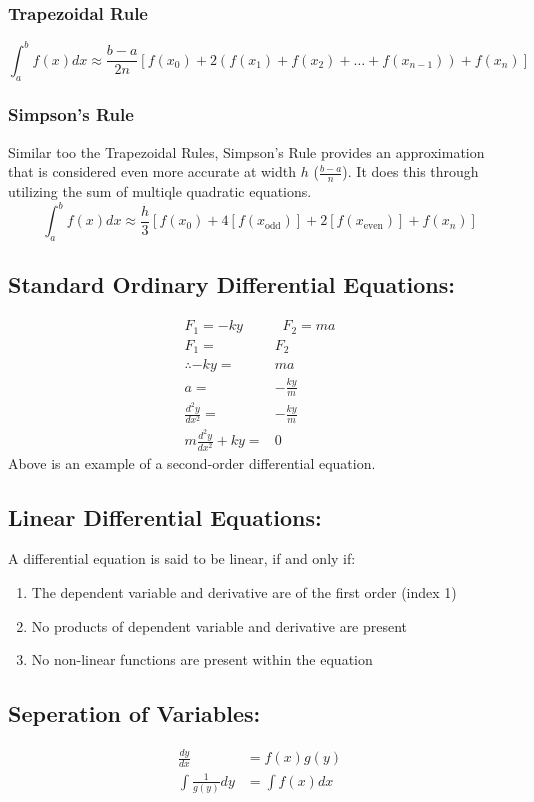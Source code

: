 \documentclass[a5paper]{article}
\begin{document}
	\subsubsection{Trapezoidal Rule}
	$$\int^{b}_{a}f(x)dx\approx\frac{b-a}{2n}[f(x_{0})+2(f(x_{1})+f(x_{2})+\ldots+f(x_{n-1}))+f(x_{n})]$$
	\subsubsection{Simpson's Rule}
	Similar too the Trapezoidal Rules, Simpson's Rule provides an approximation that is considered even more accurate at width $h$ ($\frac{b-a}{n}$). It does this through utilizing the sum of multiqle quadratic equations.
	$$\int^{b}_{a}f(x)dx\approx\frac{h}{3}[f(x_{0})+4[f(x_{\text{odd}})]+2[f(x_{\text{even}})]+f(x_{n})]$$
	\subsection{Standard Ordinary Differential Equations:}
	\begin{align*}
		F_{1}=-ky\;\;&\;\;F_{2}=ma\\
		F_{1}=&F_{2}\\
		\therefore-ky=&ma\\
		a=&-\frac{ky}{m}\\
		\frac{d^{2}y}{dx^{2}}=&-\frac{ky}{m}\\
		m\frac{d^{2}y}{dx^{2}}+ky=&0
	\end{align*}
	Above is an example of a second-order differential equation.
	\subsection{Linear Differential Equations:}
	A differential equation is said to be linear, if and only if:
	\begin{enumerate}
		\item The dependent variable and derivative are of the first order (index 1)
		\item No products of dependent variable and derivative are present
		\item No non-linear functions are present within the equation
	\end{enumerate}
	\subsection{Seperation of Variables:}
	\begin{align*}
		\frac{dy}{dx}&=f(x)g(y)\\
		\int\frac{1}{g(y)}dy&=\int f(x)dx
	\end{align*}
\end{document}
